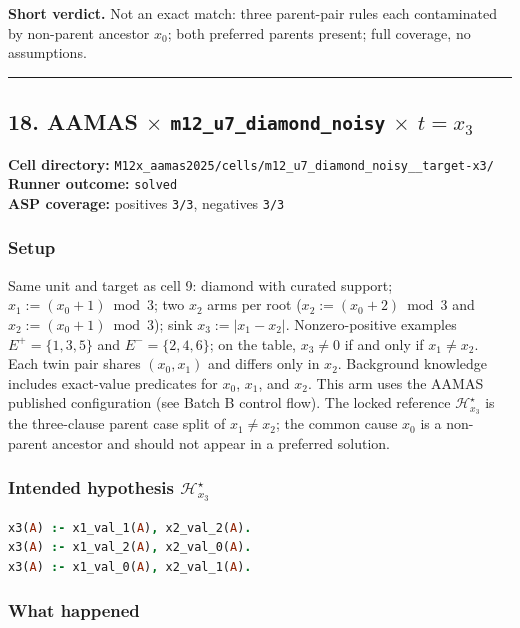 \documentclass[11pt]{article}
\begin{document}
\textbf{Short verdict.} Not an exact match: three parent-pair rules each contaminated by non-parent ancestor \(x_0\); both preferred parents present; full coverage, no assumptions.

\medskip\hrule\medskip

\subsection{\texorpdfstring{18. AAMAS \(\times\) \texttt{m12\_u7\_diamond\_noisy} \(\times\) \(t=x_3\)}{18. AAMAS - m12-u7-diamond-noisy - target x3}}

\textbf{Cell directory:} \texttt{M12x\_aamas2025/cells/m12\_u7\_diamond\_noisy\_\_target-x3/}\\
\textbf{Runner outcome:} \texttt{solved}\\
\textbf{ASP coverage:} positives \texttt{3/3}, negatives \texttt{3/3}

\subsubsection{Setup}

Same unit and target as cell 9: diamond with curated support; \(x_1:=(x_0+1)\bmod 3\); two \(x_2\) arms per root (\(x_2:=(x_0+2)\bmod 3\) and \(x_2:=(x_0+1)\bmod 3\)); sink \(x_3:=|x_1-x_2|\). Nonzero-positive examples \(E^+=\{1,3,5\}\) and \(E^-=\{2,4,6\}\); on the table, \(x_3\neq 0\) if and only if \(x_1\neq x_2\). Each twin pair shares \((x_0,x_1)\) and differs only in \(x_2\). Background knowledge includes exact-value predicates for \(x_0\), \(x_1\), and \(x_2\). This arm uses the AAMAS published configuration (see Batch B control flow). The locked reference \(\mathcal{H}_{x_3}^\star\) is the three-clause parent case split of \(x_1\neq x_2\); the common cause \(x_0\) is a non-parent ancestor and should not appear in a preferred solution.

\subsubsection{\texorpdfstring{Intended hypothesis \(\mathcal{H}_{x_3}^\star\)}{Intended hypothesis H-star(x3)}}

\begin{lstlisting}[style=logic,language=Prolog]
x3(A) :- x1_val_1(A), x2_val_2(A).
x3(A) :- x1_val_2(A), x2_val_0(A).
x3(A) :- x1_val_0(A), x2_val_1(A).
\end{lstlisting}

\subsubsection{What happened}
\end{document}
